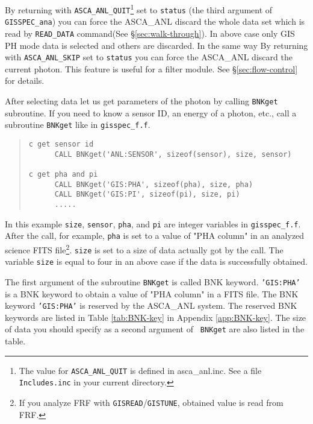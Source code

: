 By returning with {\tt ASCA\_ANL\_QUIT}\footnote{
The value for {\tt ASCA\_ANL\_QUIT} is defined in asca\_anl.inc.
See a file {\tt Includes.inc} in your current directory.}
set to {\tt status} (the third argument of {\tt GISSPEC\_ana})
you can force the ASCA\_ANL discard the whole data set
which is read by {\tt READ\_DATA} command(See \S \ref{sec:walk-through}).
In above case
only GIS PH mode data is selected and others are discarded.
In the same way
By returning with {\tt ASCA\_ANL\_SKIP} set to {\tt status}
you can force the ASCA\_ANL discard the current photon.
This feature is useful for a filter module.
See \S \ref{sec:flow-control} for details.

After selecting data
let us get parameters of the photon by calling {\tt BNKget} subroutine.
If you need to know a sensor ID, an energy of a photon, etc.,
call a subroutine {\tt BNKget} like in {\tt gisspec\_f.f}.
%
\begin{quote}\baselineskip 3.2mm\begin{verbatim}
c get sensor id
      CALL BNKget('ANL:SENSOR', sizeof(sensor), size, sensor)

c get pha and pi
      CALL BNKget('GIS:PHA', sizeof(pha), size, pha)
      CALL BNKget('GIS:PI', sizeof(pi), size, pi)
      .....
\end{verbatim}\end{quote}
%
In this example
{\tt size}, {\tt sensor}, {\tt pha}, and {\tt pi}
are integer variables in {\tt gisspec\_f.f}.
After the call,
for example,
{\tt pha} is set to a value of "PHA column"
in an analyzed science FITS file\footnote{
If you analyze FRF with {\tt GISREAD}/{\tt GISTUNE},
obtained value is read from FRF.
}.
{\tt size} is set to a size of data actually got by the call.
The variable {\tt size} is equal to four in an above case
if the data is successfully obtained.

The first argument of the subroutine {\tt BNKget} is called BNK  
keyword.
{\tt 'GIS:PHA'} is a BNK keyword
to obtain a value of "PHA column" in a FITS file.
The BNK keyword {\tt 'GIS:PHA'} is reserved by the ASCA\_ANL system.
The reserved BNK keywords are listed
in Table \ref{tab:BNK-key} in Appendix \ref{app:BNK-key}.
The size of data you should specify as a second argument of {\tt  
BNKget}
are also listed in the table.


